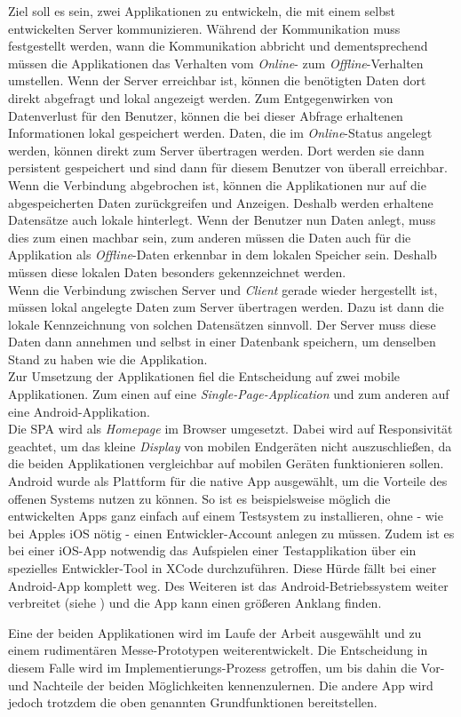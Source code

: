 Ziel soll es sein, zwei Applikationen zu entwickeln, die mit einem selbst entwickelten Server kommunizieren. Während der Kommunikation muss festgestellt werden, wann die Kommunikation abbricht und dementsprechend müssen die Applikationen das Verhalten vom \textit{Online}- zum \textit{Offline}-Verhalten umstellen. Wenn der Server erreichbar ist, können die benötigten Daten dort direkt abgefragt und lokal angezeigt werden. Zum Entgegenwirken von Datenverlust für den Benutzer, können die bei dieser Abfrage erhaltenen Informationen lokal gespeichert werden. Daten, die im \textit{Online}-Status angelegt werden, können direkt zum Server übertragen werden. Dort werden sie dann persistent gespeichert und sind dann für diesem Benutzer von überall erreichbar.\\
Wenn die Verbindung abgebrochen ist, können die Applikationen nur auf die abgespeicherten Daten zurückgreifen und Anzeigen. Deshalb werden erhaltene Datensätze auch lokale hinterlegt. Wenn der Benutzer nun Daten anlegt, muss dies zum einen machbar sein, zum anderen müssen die Daten auch für die Applikation als \textit{Offline}-Daten erkennbar in dem lokalen Speicher sein. Deshalb müssen diese lokalen Daten besonders gekennzeichnet werden.\\
Wenn die Verbindung zwischen Server und \textit{Client} gerade wieder hergestellt ist, müssen lokal angelegte Daten zum Server übertragen werden. Dazu ist dann die lokale Kennzeichnung von solchen Datensätzen sinnvoll. Der Server muss diese Daten dann annehmen und selbst in einer Datenbank speichern, um denselben Stand zu haben wie die Applikation.\\

Zur Umsetzung der Applikationen fiel die Entscheidung auf zwei mobile Applikationen. Zum einen auf eine \textit{Single-Page-Application} und zum anderen auf eine Android-Applikation.\\
Die \ac{SPA} wird als \textit{Homepage} im Browser umgesetzt. Dabei wird auf Responsivität geachtet, um das kleine \textit{Display} von mobilen Endgeräten nicht auszuschließen, da die beiden Applikationen vergleichbar auf mobilen Geräten funktionieren sollen.\\
Android wurde als Plattform für die native App ausgewählt, um die Vorteile des offenen Systems nutzen zu können. So ist es beispielsweise möglich die entwickelten Apps ganz einfach auf einem Testsystem zu installieren, ohne - wie bei Apples iOS nötig - einen Entwickler-Account anlegen zu müssen. Zudem ist es bei einer iOS-App notwendig das Aufspielen einer Testapplikation über ein spezielles Entwickler-Tool in XCode durchzuführen. Diese Hürde fällt bei einer Android-App komplett weg. Des Weiteren ist das Android-Betriebssystem weiter verbreitet (siehe \citep{Statista-SmartphoneVerteilung}) und die App kann einen größeren Anklang finden.

Eine der beiden Applikationen wird im Laufe der Arbeit ausgewählt und zu einem rudimentären Messe-Prototypen weiterentwickelt. Die Entscheidung in diesem Falle wird im Implementierungs-Prozess getroffen, um bis dahin die Vor- und Nachteile der beiden Möglichkeiten kennenzulernen. Die andere App wird jedoch trotzdem die oben genannten Grundfunktionen bereitstellen.